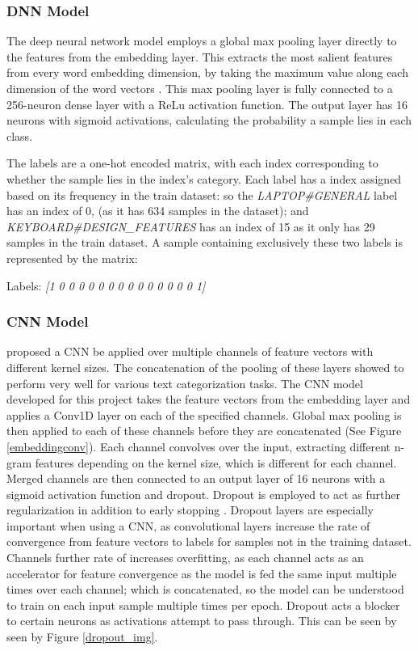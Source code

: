 \documentclass[11pt]{article}
\begin{document}
\subsubsection{DNN Model}

The deep neural network model employs a global max pooling layer directly to the features from the embedding layer. This extracts the most salient features from every word embedding dimension, by taking the maximum value along each dimension of the word vectors \textcolor{cite}{\cite{baselinewordembeddings}}. This max pooling layer is fully connected to a 256-neuron dense layer with a ReLu activation function. The output layer has 16 neurons with sigmoid activations, calculating the probability a sample lies in each class.   

The labels are a one-hot encoded matrix, with each index corresponding to whether the sample lies in the index's category. Each label has a index assigned based on its frequency in the train dataset: so the \textit{LAPTOP\#GENERAL} label has an index of 0, (as it has 634 samples in the dataset); and \textit{KEYBOARD\#DESIGN\_FEATURES} has an index of 15 as it only has 29 samples in the train dataset. A sample containing exclusively these two labels is represented by the matrix: 
\begin{center}
    Labels:
    \textit{[1 0 0 0 0 0 0 0 0 0 0 0 0 0 0 1]}\\
\end{center}

\subsubsection{CNN Model}
\textcolor{cite}{\cite{yoonkim}} proposed a CNN be applied over multiple channels of feature vectors with different kernel sizes. The concatenation of the pooling of these layers showed to perform very well for various text categorization tasks. 
The CNN model developed for this project takes the feature vectors from the embedding layer and applies a Conv1D layer on each of the specified channels. Global max pooling is then applied to each of these channels before they are concatenated (See Figure \ref{embeddingconv}).
Each channel convolves over the input, extracting different n-gram features depending on the kernel size, which is different for each channel. Merged channels are then connected to an output layer of 16 neurons with a sigmoid activation function and dropout. Dropout is employed to act as further regularization in addition to early stopping \textcolor{cite}{\cite{dropout}}. Dropout layers are especially important when using a CNN, as convolutional layers increase the rate of convergence from feature vectors to labels for samples not in the training dataset. Channels further rate of increases overfitting, as each channel acts as an accelerator for feature convergence as the model is fed the same input multiple times over each channel; which is concatenated, so the model can be understood to train on each input sample multiple times per epoch. Dropout acts a blocker to certain neurons as activations attempt to pass through. This can be seen by seen by Figure \ref{dropout_img}. 
\end{document}
